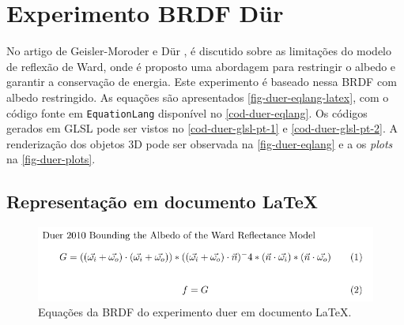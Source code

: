 \section{Experimento BRDF Dür}

No artigo de Geisler-Moroder e Dür \cite{duer2010bounding}, é discutido sobre as limitações do modelo de reflexão de Ward, onde é proposto uma abordagem para restringir o albedo e garantir a conservação de energia. Este experimento é baseado nessa BRDF com albedo restringido. As equações são apresentados \autoref{fig-duer-eqlang-latex}, com o código fonte em \texttt{EquationLang} disponível no \autoref{cod-duer-eqlang}. Os códigos gerados em GLSL pode ser vistos no \autoref{cod-duer-glsl-pt-1} e \autoref{cod-duer-glsl-pt-2}. A renderização dos objetos 3D pode ser observada na \autoref{fig-duer-eqlang} e a os \textit{plots} na \autoref{fig-duer-plots}.

\subsection{Representação em documento \LaTeX{}}
\begin{figure}[H]
    \caption{\label{fig-duer-eqlang-latex} \small Equações da BRDF do experimento duer em documento \LaTeX{}.}
    \begin{center}
        \includegraphics[scale=0.92]{./Imagens/brdfs/duer.pdf}
    \end{center}
\end{figure}

